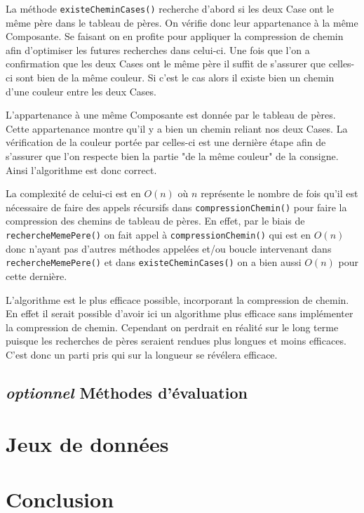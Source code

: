 \documentclass{article}
\newcommand{\info}{\texttt}
\begin{document}
                La méthode \info{existeCheminCases()} recherche d'abord si les deux Case ont le même père dans le tableau de pères. On vérifie donc leur  appartenance à la même Composante. Se faisant on en profite pour appliquer la compression de chemin afin d'optimiser les futures recherches dans celui-ci. Une fois que l'on a confirmation que les deux Cases ont le même père il suffit de s'assurer que celles-ci sont bien de la même couleur. Si c'est le cas alors il existe bien un chemin d'une couleur entre les deux Cases.
                
                L'appartenance à une même Composante est donnée par le tableau de pères. Cette appartenance montre qu'il y a bien un chemin reliant nos deux Cases. La vérification de la couleur portée par celles-ci est une dernière étape afin de s'assurer que l'on respecte bien la partie "de la même couleur" de la consigne. Ainsi l'algorithme est donc correct.
                
                La complexité de celui-ci est en $O(n)$ où $n$ représente le nombre de fois qu'il est nécessaire de faire des appels récursifs dans \info{compressionChemin()} pour faire la compression des chemins de tableau de pères. En effet, par le biais de \info{rechercheMemePere()} on fait appel à \info{compressionChemin()} qui est en $O(n)$ donc n'ayant pas d'autres méthodes appelées et/ou boucle intervenant dans \info{rechercheMemePere()} et dans \info{existeCheminCases()} on a bien aussi $O(n)$ pour cette dernière.
                
                L'algorithme est le plus efficace possible, incorporant la compression de chemin. En effet il serait possible d'avoir ici un algorithme plus efficace sans implémenter la compression de chemin. Cependant on perdrait en réalité sur le long terme puisque les recherches de pères seraient rendues plus longues et moins efficaces. C'est donc un parti pris qui sur la longueur se révélera efficace.

    \subsection{\emph{optionnel} Méthodes d'évaluation}

\section{Jeux de données}

\section{Conclusion}
\end{document}
